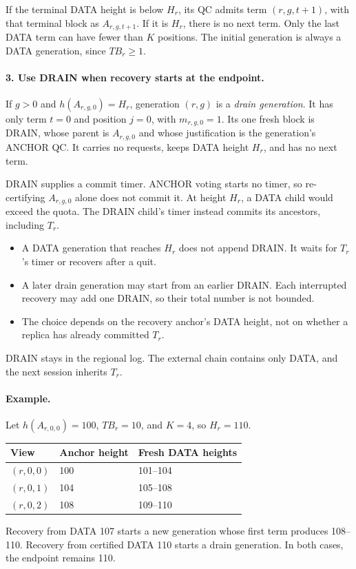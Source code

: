 \documentclass[11pt,a4paper]{article}
\newcommand{\TB}{\mathit{TB}}
\newcommand{\defterm}[1]{\textcolor{rrBlue}{\textit{#1}}}
\begin{document}
If the terminal DATA height is below $H_r$, its QC admits term
$(r,g,t+1)$, with that terminal block as $A_{r,g,t+1}$. If it is $H_r$,
there is no next term. Only the last DATA term can have fewer than $K$
positions. The initial generation is always a DATA generation, since
$\TB_r\ge1$.

\paragraph{3. Use DRAIN when recovery starts at the endpoint.}
If $g>0$ and $h(A_{r,g,0})=H_r$, generation $(r,g)$ is a
\defterm{drain generation}. It has only term $t=0$ and position $j=0$,
with $m_{r,g,0}=1$. Its one fresh block is DRAIN, whose parent is
$A_{r,g,0}$ and whose justification is the generation's ANCHOR QC.
It carries no requests, keeps DATA height $H_r$, and has no next term.

DRAIN supplies a commit timer. ANCHOR voting starts no timer, so
re-certifying $A_{r,g,0}$ alone does not commit it. At height $H_r$, a
DATA child would exceed the quota. The DRAIN child's timer instead
commits its ancestors, including $T_r$.
\begin{itemize}
\item A DATA generation that reaches $H_r$ does not append DRAIN.
It waits for $T_r$'s timer or recovers after a quit.
\item A later drain generation may start from an earlier DRAIN.
Each interrupted recovery may add one DRAIN, so their total number
is not bounded.
\item The choice depends on the recovery anchor's DATA height, not on
whether a replica has already committed $T_r$.
\end{itemize}
DRAIN stays in the regional log. The external chain contains only DATA,
and the next session inherits $T_r$.

\paragraph{Example.}
Let $h(A_{r,0,0})=100$, $\TB_r=10$, and $K=4$, so $H_r=110$.
\begin{center}\small
\begin{tabular}{@{}lll@{}}\toprule
View & Anchor height & Fresh DATA heights\\\midrule
$(r,0,0)$ & 100 & 101--104\\
$(r,0,1)$ & 104 & 105--108\\
$(r,0,2)$ & 108 & 109--110\\\bottomrule
\end{tabular}
\end{center}
Recovery from DATA 107 starts a new generation whose first term produces
108--110. Recovery from certified DATA 110 starts a drain generation.
In both cases, the endpoint remains 110.
\end{document}
